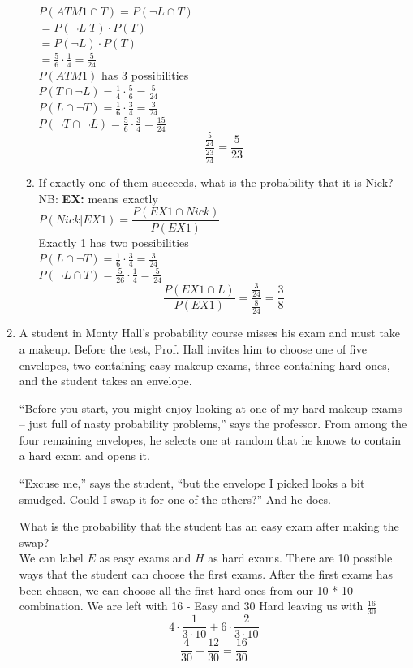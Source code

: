 \documentclass[12pt]{article}
\begin{document}
\begin{enumerate}
\begin{enumerate}
$P(ATM 1 \cap T) = P(\neg L \cap T)$ \\
$= P(\neg L | T) \cdot P(T)$ \\
$=P(\neg L) \cdot P(T)$ \\
$=\frac{5}{6} \cdot \frac{1}{4} = \frac{5}{24}$ \\
$P(ATM 1) $ has 3 possibilities \\
$P(T \cap \neg L) = \frac{1}{4} \cdot \frac{5}{6} = \frac{5}{24}$ \\
$P(L \cap \neg T) = \frac{1}{6} \cdot \frac{3}{4} = \frac{3}{24}$ \\
$P(\neg T \cap \neg L) = \frac{5}{6} \cdot \frac{3}{4} = \frac{15}{24}$\\
\[\frac{\frac{5}{24}}{\frac{23}{24}} = \frac{5}{23} \]
\item If exactly one of them succeeds, what is the probability that it is Nick? \\
  NB: \textbf{EX: } means exactly \\
  $P(Nick | EX 1) = \dfrac{P(EX 1 \cap Nick)}{P(EX 1)} $ \\
  Exactly 1 has two possibilities \\
  $P(L \cap \neg T) = \frac{1}{6} \cdot \frac{3}{4} = \frac{3}{24}$ \\
  $P(\neg L \cap T) = \frac{5}{26} \cdot \frac{1}{4} = \frac{5}{24}$ \\
  \[ \dfrac{P(EX 1 \cap L)}{P(EX 1)} = \dfrac{\frac{3}{24}}{\frac{8}{24}} = \dfrac{3}{8} \]
\end{enumerate}

\item A student in Monty Hall's probability course misses his exam and must take a makeup. Before the test, Prof. Hall invites him to choose one of five envelopes, two containing easy makeup exams, three containing hard ones, and the student takes an envelope.

``Before you start, you might enjoy looking at one of my hard makeup exams -- just full of nasty probability problems,'' says the professor. From among the four remaining envelopes, he selects one at random that he knows to contain a hard exam and opens it.

``Excuse me,'' says the student, ``but the envelope I picked looks a bit smudged. Could I swap it for one of the others?'' And he does.

What is the probability that the student has an easy exam after making the swap? \\
We can label $E$ as easy exams and $H$ as hard exams. There are 10 possible ways that the student can choose the first exams. After the first exams has been chosen, we can choose all the first hard ones from our 10 * 10 combination. We are left with 16 - Easy and 30 Hard leaving us with $\frac{16}{30}$
\[4 \cdot \dfrac{1}{3 \cdot 10} + 6 \cdot \dfrac{2}{3 \cdot 10} \]
\[\dfrac{4}{30} + \dfrac{12}{30} = \dfrac{16}{30} \]


\end{enumerate}
\end{document}
